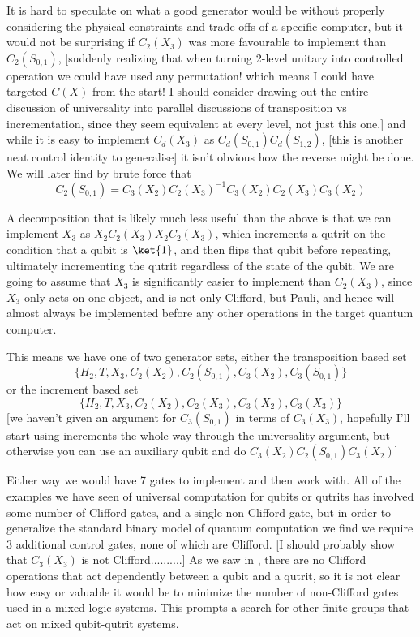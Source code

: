 It is hard to speculate on what a good generator would be without properly considering the physical constraints and trade-offs of a specific computer, but it would not be surprising if $C_2(X_3)$ was more favourable to implement than $C_2(S_{0, 1})$, [suddenly realizing that when turning 2-level unitary into controlled operation we could have used any permutation! which means I could have targeted $C(X)$ from the start! I should consider drawing out the entire discussion of universality into parallel discussions of transposition vs incrementation, since they seem equivalent at every level, not just this one.] and while it is easy to implement $C_d(X_3)$ as $C_d(S_{0,1})C_d(S_{1,2})$, [this is another neat control identity to generalise] it isn't obvious how the reverse might be done. We will later find by brute force that
\[C_2(S_{0,1}) = C_3(X_2) C_2(X_3)^{-1} C_3(X_2) C_2(X_3) C_3(X_2)\]

A decomposition that is likely much less useful than the above is that we can implement $X_3$ as $X_2C_2(X_3)X_2C_2(X_3)$, which increments a qutrit on the condition that a qubit is $\ket{1}$, and then flips that qubit before repeating, ultimately incrementing the qutrit regardless of the state of the qubit. We are going to assume that $X_3$ is significantly easier to implement than $C_2(X_3)$, since $X_3$ only acts on one object, and is not only Clifford, but Pauli, and hence will almost always be implemented before any other operations in the target quantum computer.

This means we have one of two generator sets, either the transposition based set
\[\{H_2, T, X_3, C_2(X_2), C_2(S_{0, 1}), C_3(X_2), C_3(S_{0, 1})\}\]
or the increment based set
\[\{H_2, T, X_3, C_2(X_2), C_2(X_3), C_3(X_2), C_3(X_3)\}\]
[we haven't given an argument for $C_3(S_{0,1})$ in terms of $C_3(X_3)$, hopefully I'll start using increments the whole way through the universality argument, but otherwise you can use an auxiliary qubit and do $C_3(X_2)C_2(S_{0,1})C_3(X_2)$]

Either way we would have 7 gates to implement and then work with. All of the examples we have seen of universal computation for qubits or qutrits has involved some number of Clifford gates, and a single non-Clifford gate, but in order to generalize the standard binary model of quantum computation we find we require 3 additional control gates, none of which are Clifford. [I should probably show that $C_3(X_3)$ is not Clifford..........] As we saw in \cite{tolar-clifford}, there are no Clifford operations that act dependently between a qubit and a qutrit, so it is not clear how easy or valuable it would be to minimize the number of non-Clifford gates used in a mixed logic systems. This prompts a search for other finite groups that act on mixed qubit-qutrit systems.

